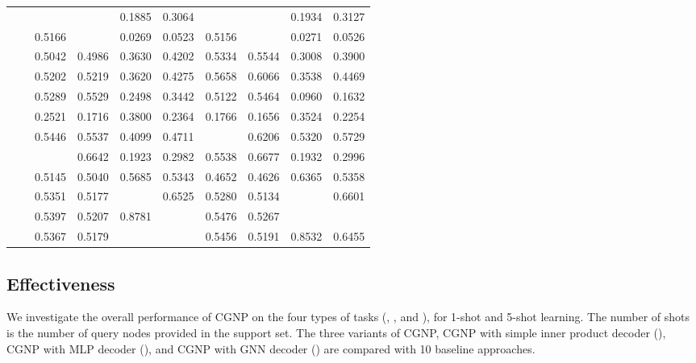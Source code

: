 {\begin{table}[t]
{\begin{tabular}{|l|l|r|r|r|r|r|r|r|r|}
				\multirow{11}{*}{\rotatebox{90}{\Citeseercora}} 
				&\ATC       & \cellcolor{LightRed}{0.5779} & \cellcolor{LightCyan}{0.8191} & 0.1885 & 0.3064 & \cellcolor{LightCyan}{0.5783} & \cellcolor{LightCyan}{0.8154} & 0.1934 & 0.3127 \\
				&\CTC       & 0.5166 & \cellcolor{LightRed}{0.8714} & 0.0269 & 0.0523 & 0.5156 & \cellcolor{LightRed}{0.8692} & 0.0271 & 0.0526 \\\cline{2-10}
				&\MAML      & 0.5042 & 0.4986 & 0.3630 & 0.4202 & 0.5334 & 0.5544 & 0.3008 & 0.3900 \\
				&\Reptile   & 0.5202 & 0.5219 & 0.3620 & 0.4275 & 0.5658 & 0.6066 & 0.3538 & 0.4469 \\
				&\Featrans  & 0.5289 & 0.5529 & 0.2498 & 0.3442 & 0.5122 & 0.5464 & 0.0960 & 0.1632 \\
				&\PN        & 0.2521 & 0.1716 & 0.3800 & 0.2364 & 0.1766 & 0.1656 & 0.3524 & 0.2254 \\\cline{2-10}
				&\Supervise & 0.5446 & 0.5537 & 0.4099 & 0.4711 & \cellcolor{LightRed}{0.6066} & 0.6206 & 0.5320 & 0.5729 \\
				&\ICSGNN    & \cellcolor{LightCyan}{0.5532} & 0.6642 & 0.1923 & 0.2982 & 0.5538 & 0.6677 & 0.1932 & 0.2996 \\
				&\AQDGNN    & 0.5145 & 0.5040 & 0.5685 & 0.5343 & 0.4652 & 0.4626 & 0.6365 & 0.5358\\\cline{2-10}
				&\CGNPIP    & 0.5351 & 0.5177 & \cellcolor{LightCyan}{0.8822} & 0.6525 & 0.5280 & 0.5134 & \cellcolor{LightRed}{0.9241} & \cellcolor{LightRed}0.6601 \\
				&\CGNPMLP   & 0.5397 & 0.5207 & 0.8781 & \cellcolor{LightCyan}{0.6537} & 0.5476 & 0.5267 & \cellcolor{LightCyan}{0.8654} & \cellcolor{LightCyan}{0.6548} \\
				&\CGNPGNN   & 0.5367 & 0.5179 & \cellcolor{LightRed}{0.9181} & \cellcolor{LightRed}{0.6623} &  0.5456 & 0.5191 & 0.8532 & 0.6455\\\hline
			\end{tabular}
		}
	\end{table}
}


\subsection{Effectiveness}
\label{sec:exp:effect}

We investigate the overall performance of CGNP on the four types of
tasks (\SGSC, \SGDC, \MGOD and \MGDD), for 1-shot and 5-shot
learning. The number of shots is the number of query nodes provided in
the support set.  The three variants of CGNP, CGNP with simple inner
product decoder (\CGNPIP), CGNP with MLP decoder (\CGNPMLP), and CGNP
with GNN decoder (\CGNPGNN) are compared with 10 baseline approaches.

